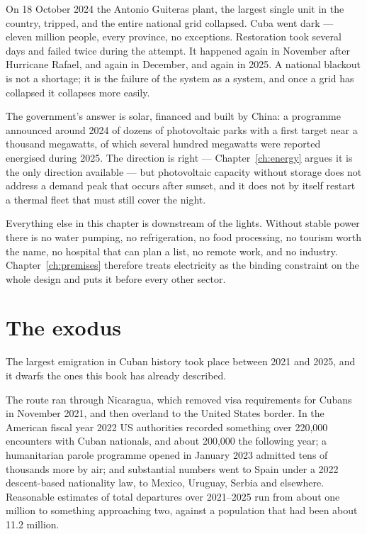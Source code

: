 On 18 October 2024 the Antonio Guiteras plant, the largest single unit in the
country, tripped, and the entire national grid collapsed. Cuba went dark ---
eleven million people, every province, no exceptions. Restoration took several
days and failed twice during the attempt. It happened again in November after
Hurricane Rafael, and again in December, and again in 2025.\unv{} A national
blackout is not a shortage; it is the failure of the system as a system, and
once a grid has collapsed it collapses more easily.

The government's answer is solar, financed and built by China: a programme
announced around 2024 of dozens of photovoltaic parks with a first target near a
thousand megawatts, of which several hundred megawatts were reported energised
during 2025.\unv{} The direction is right --- Chapter~\ref{ch:energy} argues it
is the only direction available --- but photovoltaic capacity without storage
does not address a demand peak that occurs after sunset, and it does not by
itself restart a thermal fleet that must still cover the night.

Everything else in this chapter is downstream of the lights. Without stable
power there is no water pumping, no refrigeration, no food processing, no
tourism worth the name, no hospital that can plan a list, no remote work, and no
industry. Chapter~\ref{ch:premises} therefore treats electricity as the binding
constraint on the whole design and puts it before every other sector.

\section{The exodus}

The largest emigration in Cuban history took place between 2021 and 2025, and it
dwarfs the ones this book has already described.

The route ran through Nicaragua, which removed visa requirements for Cubans in
November 2021, and then overland to the United States border. In the American
fiscal year 2022 US authorities recorded something over 220,000 encounters with
Cuban nationals, and about 200,000 the following year; a humanitarian parole
programme opened in January 2023 admitted tens of thousands more by air; and
substantial numbers went to Spain under a 2022 descent-based nationality law, to
Mexico, Uruguay, Serbia and elsewhere.\unv{} Reasonable estimates of total
departures over 2021--2025 run from about one million to something approaching
two, against a population that had been about 11.2 million.

